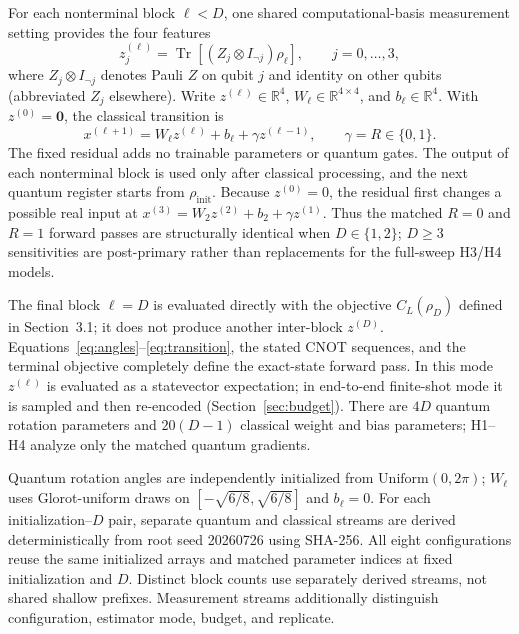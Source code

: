 \documentclass[pdflatex,sn-mathphys-num,Numbered]{sn-jnl}
\begin{document}
For each nonterminal block $\ell<D$, one shared computational-basis measurement setting provides the four features
\begin{equation}\label{eq:features}
 z_j^{(\ell)}=\operatorname{Tr}[(Z_j\otimes I_{\neg j})\rho_\ell],\qquad j=0,\ldots,3,
\end{equation}
where $Z_j\otimes I_{\neg j}$ denotes Pauli $Z$ on qubit $j$ and identity on other qubits (abbreviated $Z_j$ elsewhere). Write $z^{(\ell)}\in\mathbb R^4$, $W_\ell\in\mathbb R^{4\times4}$, and $b_\ell\in\mathbb R^4$. With $z^{(0)}=\mathbf0$, the classical transition is
\begin{equation}\label{eq:transition}
 x^{(\ell+1)}=W_\ell z^{(\ell)}+b_\ell+\gamma z^{(\ell-1)},\qquad
 \gamma=R\in\{0,1\}.
\end{equation}
The fixed residual adds no trainable parameters or quantum gates. The output of each nonterminal block is used only after classical processing, and the next quantum register starts from $\rho_{\mathrm{init}}$. Because $z^{(0)}=0$, the residual first changes a possible real input at $x^{(3)}=W_2z^{(2)}+b_2+\gamma z^{(1)}$. Thus the matched $R=0$ and $R=1$ forward passes are structurally identical when $D\in\{1,2\}$; $D\ge3$ sensitivities are post-primary rather than replacements for the full-sweep H3/H4 models.

The final block $\ell=D$ is evaluated directly with the objective $C_L(\rho_D)$ defined in Section~3.1; it does not produce another inter-block $z^{(D)}$. Equations~\eqref{eq:angles}--\eqref{eq:transition}, the stated CNOT sequences, and the terminal objective completely define the exact-state forward pass. In this mode $z^{(\ell)}$ is evaluated as a statevector expectation; in end-to-end finite-shot mode it is sampled and then re-encoded (Section~\ref{sec:budget}). There are $4D$ quantum rotation parameters and $20(D-1)$ classical weight and bias parameters; H1--H4 analyze only the matched quantum gradients.

Quantum rotation angles are independently initialized from $\mathrm{Uniform}(0,2\pi)$; $W_\ell$ uses Glorot-uniform draws on $[-\sqrt{6/8},\sqrt{6/8}]$ and $b_\ell=0$. For each initialization--$D$ pair, separate quantum and classical streams are derived deterministically from root seed 20260726 using SHA-256. All eight configurations reuse the same initialized arrays and matched parameter indices at fixed initialization and $D$. Distinct block counts use separately derived streams, not shared shallow prefixes. Measurement streams additionally distinguish configuration, estimator mode, budget, and replicate.
\end{document}
